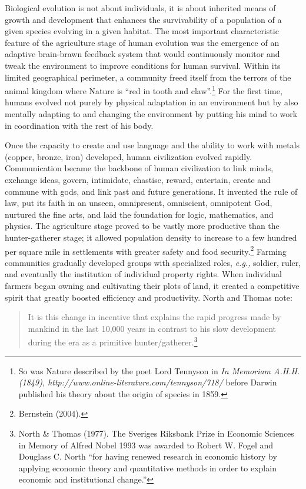 \begin{multicols}{2}
Biological evolution is not about individuals, it is about inherited means of growth and development that enhances the survivability of a population of a given species evolving in a given habitat. The most important characteristic feature of the agriculture stage of human evolution was the emergence of an adaptive brain-brawn feedback system that would continuously monitor and tweak the environment to improve conditions for human survival. Within its limited geographical perimeter, a community freed itself from the terrors of the animal kingdom where Nature is “red in tooth and claw”.\footnote{So was Nature described by the poet Lord Tennyson in \textit{In Memoriam A.H.H. (1849), http://www.online-literature.com/tennyson/718/} before Darwin published his theory about the origin of species in 1859.} For the first time, humans evolved not purely by physical adaptation in an environment but by also mentally adapting to and changing the environment by putting his mind to work in coordination with the rest of his body.

Once the capacity to create and use language and the ability to work with metals (copper, bronze, iron) developed, human civilization evolved rapidly. Communication became the backbone of human civilization to link minds, exchange ideas, govern, intimidate, chastise, reward, entertain, create and commune with gods, and link past and future generations. It invented the rule of law, put its faith in an unseen, omnipresent, omniscient, omnipotent God, nurtured the fine arts, and laid the foundation for logic, mathematics, and physics. The agriculture stage proved to be vastly more productive than the hunter-gatherer stage; it allowed population density to increase to a few hundred per square mile in settlements with greater safety and food security.\footnote{Bernstein (2004).} Farming communities gradually developed groups with specialized roles, \textit{e.g.,} soldier, ruler, and eventually the institution of individual property rights. When individual farmers began owning and cultivating their plots of land, it created a competitive spirit that greatly boosted efficiency and productivity. North and Thomas note: 
\begin{quote}
It is this change in incentive that explains the rapid progress made by mankind in the last 10,000 years in contrast to his slow development during the era as a primitive hunter/gatherer.\footnote{North \& Thomas (1977). The Sveriges Riksbank Prize in Economic Sciences in Memory of Alfred Nobel 1993 was awarded to Robert W. Fogel and Douglass C. North “for having renewed research in economic history by applying economic theory and quantitative methods in order to explain economic and institutional change.”}
\end{quote}


\end{multicols}
